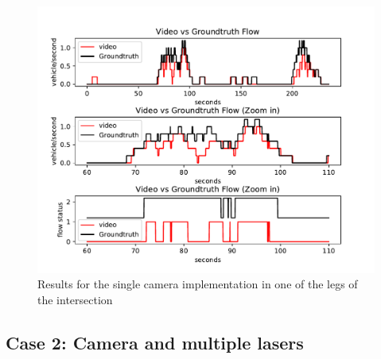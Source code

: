 \begin{figure}[ht!]
\centering
\includegraphics[scale=0.42]{fig/4/video_res.pdf}
\caption{Results for the single camera implementation in one of the legs of the intersection}
\label{video_res}
\end{figure}


\subsection{Case 2: Camera and multiple lasers}

